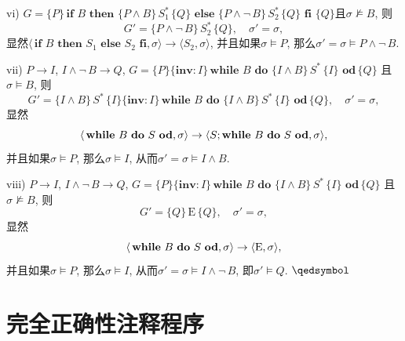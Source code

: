 \documentclass[UTF8]{ctexart}
\begin{document}
\vspace{1pt}
\hspace{0.5em} vi) $G=\{P\}\,\mathbf{if}\,\,B\,\,\mathbf{then}\,\,
\{P\land B\}\,S_1^*\,\{Q\}\,\,\mathbf{else}\,\,\{P\land\neg\,B\}\,S_2^*
\,\{Q\}\,\,\mathbf{fi}\,\,\{Q\}$且$\sigma\not\models B$, 则
\[
    G'=\{P\land\neg\,B\}\,S_2^*\,\{Q\},\quad\sigma'=\sigma,
\]
显然$\langle\,\mathbf{if}\,\,B\,\,\mathbf{then}\,\,S_1\,\,\mathbf{else}\,\,
S_2\,\,\mathbf{fi},\sigma\rangle\to\langle S_2,\sigma\rangle$,
并且如果$\sigma\models P$, 那么$\sigma'=\sigma\models P\land\neg\,B$.

\vspace{1pt}
\hspace{0.5em} vii) $P\to I$, $I\land\neg\,B\to Q$,
$G=\{P\}\{\mathbf{inv}:I\}\,\mathbf{while}\,\,B\,\,
\mathbf{do}\,\,\{I\land B\}\,S^*\,\{I\}\,\,\mathbf{od}\,\{Q\}$
且$\sigma\models B$, 则
\[
    G'=\{I\land B\}\,S^*\,\{I\}\{\mathbf{inv}:I\}\,
    \mathbf{while}\,\,B\,\,\mathbf{do}\,\,
    \{I\land B\}\,S^*\,\{I\}\,\,\mathbf{od}\,\{Q\},\quad
    \sigma'=\sigma,
\]
显然
\vspace{-5pt}
\[
    \langle\,\mathbf{while}\,\,B\,\,\mathbf{do}\,\,S\,\,\mathbf{od},
    \sigma\rangle\to
    \langle S;\mathbf{while}\,\,B\,\,\mathbf{do}\,\,S\,\,\mathbf{od},
    \sigma\rangle,\\[-5pt]
\]
并且如果$\sigma\models P$, 那么$\sigma\models I$,
从而$\sigma'=\sigma\models I\land B$.

\vspace{1pt}
\hspace{0.5em} viii) $P\to I$, $I\land\neg\,B\to Q$,
$G=\{P\}\{\mathbf{inv}:I\}\,\mathbf{while}\,\,B\,\,
\mathbf{do}\,\,\{I\land B\}\,S^*\,\{I\}\,\,\mathbf{od}\,\{Q\}$
且$\sigma\not\models B$, 则
\[
    G'=\{Q\}\,\mathrm{E}\,\{Q\},\quad\sigma'=\sigma,
\]
显然
\vspace{-5pt}
\[
    \langle\,\mathbf{while}\,\,B\,\,\mathbf{do}\,\,S\,\,\mathbf{od},
    \sigma\rangle\to
    \langle\mathrm{E},\sigma\rangle,\\[-5pt]
\]
并且如果$\sigma\models P$, 那么$\sigma\models I$,
从而$\sigma'=\sigma\models I\land\neg\,B$, 即$\sigma'\models Q$.
\hfill $\qedsymbol$





\newpage

\section{完全正确性注释程序}
\end{document}
